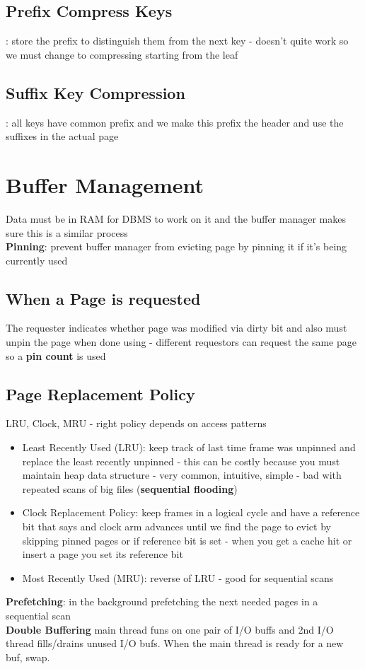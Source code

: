 \documentclass{article}
\begin{document}
\subsection{Prefix Compress Keys}: store the prefix to distinguish them from the next key - doesn't quite work so we must change to compressing starting from the leaf 
\subsection{Suffix Key Compression}: all keys have common prefix and we make this prefix the header and use the suffixes in the actual page
\section{Buffer Management}
Data must be in RAM for DBMS to work on it and the buffer manager makes sure this is a similar process \\
\textbf{Pinning}: prevent buffer manager from evicting page by pinning it if it's being currently used
\subsection{When a Page is requested}
The requester indicates whether page was modified via dirty bit and also must unpin the page when done using - different requestors can request the same page so a \textbf{pin count} is used  \\
\subsection{Page Replacement Policy}
LRU, Clock, MRU - right policy depends on access patterns \\
\begin{itemize}
\item Least Recently Used (LRU): keep track of last time frame was unpinned and replace the least recently unpinned - this can be costly because you must maintain heap data structure - very common, intuitive, simple - bad with repeated scans of big files (\textbf{sequential flooding})
\item Clock Replacement Policy: keep frames in a logical cycle and have a reference bit that says and clock arm advances until we find the page to evict by skipping pinned pages or if reference bit is set - when you get a cache hit or insert a page you set its reference bit
\item Most Recently Used (MRU): reverse of LRU - good for sequential scans
\end{itemize}
\textbf{Prefetching}: in the background prefetching the next needed pages in a sequential scan \\
\textbf{Double Buffering}
main thread funs on one pair of I/O buffs and 2nd I/O thread fills/drains unused I/O bufs. When the main thread is ready for a new buf, swap. \\
\end{document}
